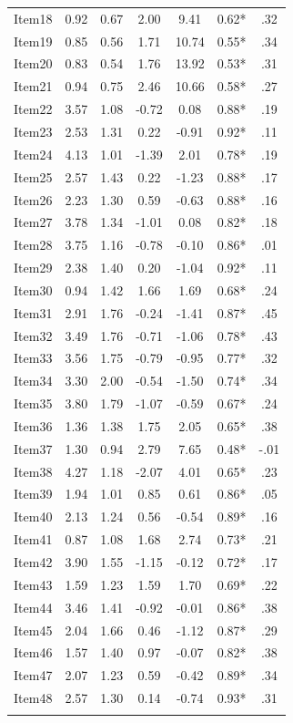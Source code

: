 \begin{appendix}
\begin{table}[h]
\begin{center}
\begin{threeparttable}
\begin{tabular}{ccccccc}
Item18 & 0.92 & 0.67 & 2.00 & 9.41 & 0.62* & .32\\
Item19 & 0.85 & 0.56 & 1.71 & 10.74 & 0.55* & .34\\
Item20 & 0.83 & 0.54 & 1.76 & 13.92 & 0.53* & .31\\
Item21 & 0.94 & 0.75 & 2.46 & 10.66 & 0.58* & .27\\
Item22 & 3.57 & 1.08 & -0.72 & 0.08 & 0.88* & .19\\
Item23 & 2.53 & 1.31 & 0.22 & -0.91 & 0.92* & .11\\
Item24 & 4.13 & 1.01 & -1.39 & 2.01 & 0.78* & .19\\
Item25 & 2.57 & 1.43 & 0.22 & -1.23 & 0.88* & .17\\
Item26 & 2.23 & 1.30 & 0.59 & -0.63 & 0.88* & .16\\
Item27 & 3.78 & 1.34 & -1.01 & 0.08 & 0.82* & .18\\
Item28 & 3.75 & 1.16 & -0.78 & -0.10 & 0.86* & .01\\
Item29 & 2.38 & 1.40 & 0.20 & -1.04 & 0.92* & .11\\
Item30 & 0.94 & 1.42 & 1.66 & 1.69 & 0.68* & .24\\
Item31 & 2.91 & 1.76 & -0.24 & -1.41 & 0.87* & .45\\
Item32 & 3.49 & 1.76 & -0.71 & -1.06 & 0.78* & .43\\
Item33 & 3.56 & 1.75 & -0.79 & -0.95 & 0.77* & .32\\
Item34 & 3.30 & 2.00 & -0.54 & -1.50 & 0.74* & .34\\
Item35 & 3.80 & 1.79 & -1.07 & -0.59 & 0.67* & .24\\
Item36 & 1.36 & 1.38 & 1.75 & 2.05 & 0.65* & .38\\
Item37 & 1.30 & 0.94 & 2.79 & 7.65 & 0.48* & -.01\\
Item38 & 4.27 & 1.18 & -2.07 & 4.01 & 0.65* & .23\\
Item39 & 1.94 & 1.01 & 0.85 & 0.61 & 0.86* & .05\\
Item40 & 2.13 & 1.24 & 0.56 & -0.54 & 0.89* & .16\\
Item41 & 0.87 & 1.08 & 1.68 & 2.74 & 0.73* & .21\\
Item42 & 3.90 & 1.55 & -1.15 & -0.12 & 0.72* & .17\\
Item43 & 1.59 & 1.23 & 1.59 & 1.70 & 0.69* & .22\\
Item44 & 3.46 & 1.41 & -0.92 & -0.01 & 0.86* & .38\\
Item45 & 2.04 & 1.66 & 0.46 & -1.12 & 0.87* & .29\\
Item46 & 1.57 & 1.40 & 0.97 & -0.07 & 0.82* & .38\\
Item47 & 2.07 & 1.23 & 0.59 & -0.42 & 0.89* & .34\\
Item48 & 2.57 & 1.30 & 0.14 & -0.74 & 0.93* & .31\\
\bottomrule
\addlinespace
\end{tabular}


\end{threeparttable}
\end{center}
\end{table}
\end{appendix}

